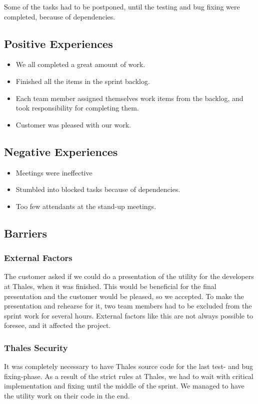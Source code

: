 Some of the tasks had to be postponed, until the testing and bug fixing were completed, because of dependencies. 

\subsection{Positive Experiences}
\begin{itemize}
\item We all completed a great amount of work.
\item Finished all the items in the sprint backlog.
\item Each team member assigned themselves work items from the backlog, and took responsibility for completing them.
\item Customer was pleased with our work.
\end{itemize}

\subsection{Negative Experiences}
\begin{itemize}
\item Meetings were ineffective
\item Stumbled into blocked tasks because of dependencies.
\item Too few attendants at the stand-up meetings.
\end{itemize}

\subsection{Barriers}

\subsubsection{External Factors}
The customer asked if we could do a presentation of the utility for the developers at Thales, when it was finished. This would be beneficial for the final presentation and the customer would be pleased, so we accepted. To make the presentation and rehearse for it, two team members had to be excluded from the sprint work for several hours. External factors like this are not always possible to foresee, and it affected the project.

\subsubsection{Thales Security}
It was completely necessary to have Thales source code for the last test- and bug fixing-phase. As a result of the strict rules at Thales, we had to wait with critical implementation and fixing until the middle of the sprint. We managed to have the utility work on their code in the end.

